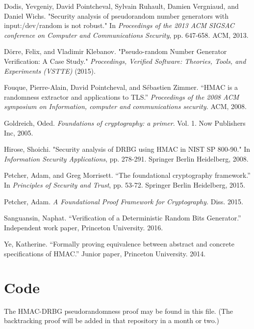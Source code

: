 \documentclass[12pt,lot, lof]{puthesis}
\begin{document}
{\begin{thebibliography}{99}
Dodis, Yevgeniy, David Pointcheval, Sylvain Ruhault, Damien Vergniaud, and Daniel Wichs. "Security analysis of pseudorandom number generators with input:/dev/random is not robust." In \emph{Proceedings of the 2013 ACM SIGSAC conference on Computer and Communications Security}, pp. 647-658. ACM, 2013.

D{\"o}rre, Felix, and Vladimir Klebanov. "Pseudo-random Number Generator Verification: A Case Study." \emph{Proceedings, Verified Software: Theories, Tools, and Experiments (VSTTE)} (2015).

Fouque, Pierre-Alain, David Pointcheval, and Sébastien Zimmer. ``HMAC is a randomness extractor and applications to TLS.'' \emph{Proceedings of the 2008 ACM symposium on Information, computer and communications security.} ACM, 2008.

Goldreich, Oded. \emph{Foundations of cryptography: a primer}. Vol. 1. Now Publishers Inc, 2005.

Hirose, Shoichi. "Security analysis of DRBG using HMAC in NIST SP 800-90." In \emph{Information Security Applications}, pp. 278-291. Springer Berlin Heidelberg, 2008.

Petcher, Adam, and Greg Morrisett. ``The foundational cryptography framework.'' In \emph{Principles of Security and Trust}, pp. 53-72. Springer Berlin Heidelberg, 2015.

Petcher, Adam. \emph{A Foundational Proof Framework for Cryptography.} Diss. 2015.

Sanguansin, Naphat. ``Verification of a Deterministic Random Bits Generator.'' Independent work paper, Princeton University. 2016.

Ye, Katherine. ``Formally proving equivalence between abstract and concrete specifications of HMAC.'' Junior paper, Princeton University. 2014.

\end{thebibliography}

 \appendix

\section{Code}

The HMAC-DRBG pseudorandomness proof may be found in this file. (The backtracking proof will be added in that repository in a month or two.) \\

}
\end{document}
